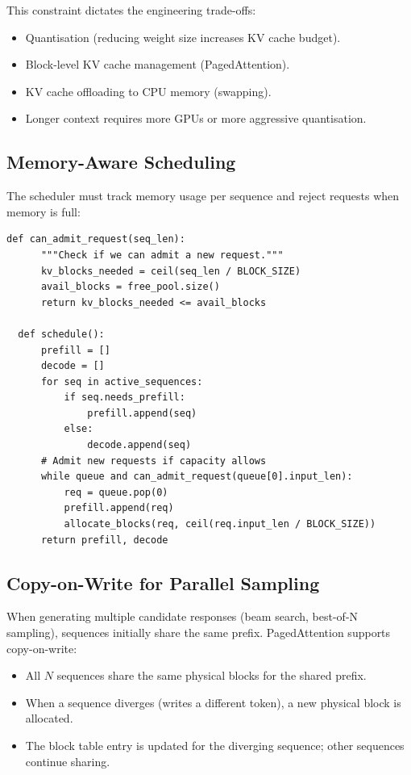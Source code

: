 \documentclass[11pt,a4paper]{article}
\theoremstyle{definition}
\begin{document}
This constraint dictates the engineering trade-offs:
\begin{itemize}
	\item Quantisation (reducing weight size increases KV cache budget).
	\item Block-level KV cache management (PagedAttention).
	\item KV cache offloading to CPU memory (swapping).
	\item Longer context requires more GPUs or more aggressive quantisation.
\end{itemize}

\subsection{Memory-Aware Scheduling}

The scheduler must track memory usage per sequence and reject requests when memory is full:

\begin{lstlisting}[caption=Memory-aware scheduling pseudocode]
  def can_admit_request(seq_len):
      """Check if we can admit a new request."""
      kv_blocks_needed = ceil(seq_len / BLOCK_SIZE)
      avail_blocks = free_pool.size()
      return kv_blocks_needed <= avail_blocks

  def schedule():
      prefill = []
      decode = []
      for seq in active_sequences:
          if seq.needs_prefill:
              prefill.append(seq)
          else:
              decode.append(seq)
      # Admit new requests if capacity allows
      while queue and can_admit_request(queue[0].input_len):
          req = queue.pop(0)
          prefill.append(req)
          allocate_blocks(req, ceil(req.input_len / BLOCK_SIZE))
      return prefill, decode
\end{lstlisting}

\subsection{Copy-on-Write for Parallel Sampling}

When generating multiple candidate responses (beam search, best-of-N sampling), sequences initially share the same prefix. PagedAttention supports copy-on-write:

\begin{itemize}
	\item All $N$ sequences share the same physical blocks for the shared prefix.
	\item When a sequence diverges (writes a different token), a new physical block is allocated.
	\item The block table entry is updated for the diverging sequence; other sequences continue sharing.
\end{itemize}
\end{document}
